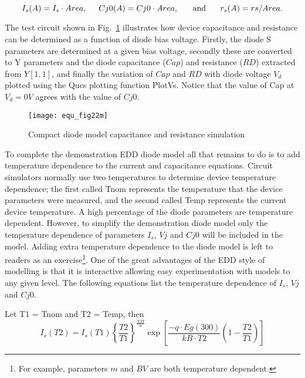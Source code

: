 \begin{equation}
 I_{s}(A)=I_{s} \cdot Area,\hspace{5mm} Cj0(A) = Cj0 \cdot Area, \hspace{5mm}\textrm{ and } \hspace{5mm} r_{s}(A) = rs/Area.
\end{equation} 

The test circuit shown in Fig.~\ref{fig:equ_22m} illustrates how device
capacitance and resistance can be determined as a function of diode
bias voltage. Firstly, the diode S parameters are determined at a
given bias voltage, secondly these are converted to Y parameters and
the diode capacitance ($Cap$) and resistance ($RD$) extracted from
$Y[1,1]$, and finally the variation of $Cap$ and $RD$ with diode
voltage $V_{d}$ plotted using the Qucs plotting function
PlotVs. Notice that the value of Cap at $V_{d} = 0V$ agrees with the 
value of $Cj0$.

\begin{figure} 
  \centering
  \texttt{[image: equ\_fig22m]}
  \caption{Compact diode model capacitance and resistance simulation} 
  \label{fig:equ_22m}
\end{figure} 

\vspace{3mm}

To complete the demonstration EDD diode model all that remains to do
is to add temperature dependence to the current and capacitance
equations. Circuit simulators normally use two temperatures to
determine device temperature dependence; the first called Tnom
represents the temperature that the device parameters were measured,
and the second called Temp represents the current device
temperature. A high percentage of the diode parameters are temperature
dependent. However, to simplify the demonstration diode model only the
temperature dependence of parameters $I_{s}$, $Vj$ and $Cj0$ will be
included in the model. Adding extra temperature dependence to the
diode model is left to readers as an exercise\footnote{For example,
parameters $m$ and $BV$ are both temperature dependent.}.  One of the
great advantages of the EDD style of modelling is that it is
interactive allowing easy experimentation with models to any given
level.  The following equations list the temperature dependence of
$I_{s}$, $Vj$ and $Cj0$.

\vspace{3mm}

Let T1 = Tnom and T2 = Temp, then
\begin{equation}
 I_{s} (T2)=I_{s}(T1) \left\lbrace \dfrac{T2}{T1}\right\rbrace ^{\frac{XTI}{n}} \exp\left[ \dfrac{-q \cdot Eg(300)}{kB \cdot T2}
 \left( 1 - \dfrac{T2}{T1}\right) \right]
 \end{equation} 

